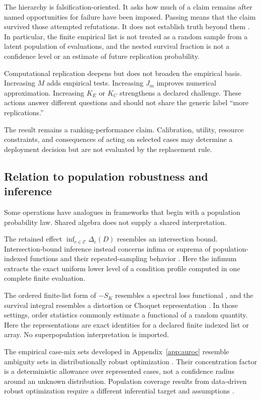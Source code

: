 \documentclass[11pt]{article}
\newcommand{\CSet}{\mathcal{C}}
\theoremstyle{remark}
\begin{document}
The hierarchy is falsification-oriented. It asks how much of a claim remains
after named opportunities for failure have been imposed. Passing means that the
claim survived those attempted refutations. It does not establish truth beyond
them \cite{popper1959logic,popper1963conjectures}. In particular, the finite
empirical list is not treated as a random sample from a latent population of
evaluations, and the nested survival fraction is not a confidence level or an
estimate of future replication probability.

Computational replication deepens but does not broaden the empirical basis.
Increasing $M$ adds empirical tests. Increasing $J_m$ improves numerical
approximation. Increasing $K_E$ or $K_C$ strengthens a declared challenge.
These actions answer different questions and should not share the generic label
``more replications.''

The result remains a ranking-performance claim. Calibration, utility, resource
constraints, and consequences of acting on selected cases may determine a
deployment decision but are not evaluated by the replacement rule.

\subsection{Relation to population robustness and inference}
\label{sec:related-frameworks}

Some operations have analogues in frameworks that begin with a population
probability law. Shared algebra does not supply a shared interpretation.

The retained effect $\inf_{c\in\CSet}\Delta_c(D)$ resembles an intersection
bound. Intersection-bound inference instead concerns infima or suprema of
population-indexed functions and their repeated-sampling behavior
\cite{chernozhukov2013intersection}. Here the infimum extracts the exact uniform
lower level of a condition profile computed in one complete finite evaluation.

The ordered finite-list form of $-S_K$ resembles a spectral loss functional
\cite{acerbi2002spectral}, and the survival integral resembles a distortion or
Choquet representation \cite{wang1996premium}. In those settings, order
statistics commonly estimate a functional of a random quantity. Here the
representations are exact identities for a declared finite indexed list or
array. No superpopulation interpretation is imported.

The empirical case-mix sets developed in Appendix~\ref{app:auroc} resemble
ambiguity sets in distributionally robust optimization
\cite{shapiro2017distributionally,bental2013robust}. Their concentration factor
is a deterministic allowance over represented cases, not a confidence radius
around an unknown distribution. Population coverage results from data-driven
robust optimization require a different inferential target and assumptions
\cite{duchi2021statistics}.
\end{document}
